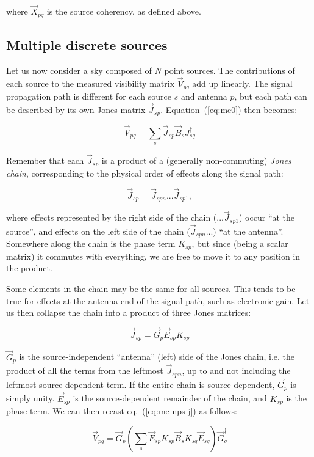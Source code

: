 \documentclass[]{aa}
\begin{document}
where $\vec X_{pq}$ is the source coherency, as defined above.
 

\subsection{Multiple discrete sources}

Let us now consider a sky composed of $N$ point sources. The contributions of each source to the measured visibility matrix $\vec V_{pq}$ add up linearly. The signal propagation path is different for each source $s$ and antenna $p$, but each path can be described by its own Jones matrix $\vec J_{sp}$. Equation~(\ref{eq:me0}) then becomes:

  \begin{equation}\label{eq:me-nps-j}
  \vec V_{pq} = \sum_{s}{\vec J_{sp} \vec B_s J^\dagger_{sq}}
  \end{equation}

Remember that each $\vec J_{sp}$ is a product of a (generally non-commuting) {\em Jones chain}, corresponding to the physical order of effects along the signal path:

  \[
  \vec J_{sp} = \vec J_{spn} ... \vec J_{sp1},
  \]

where effects represented by the right side of the chain ($...\vec J_{sp1}$) occur ``at the source'', and effects on the left side of the chain ($\vec J_{spn}...$) ``at the antenna''. Somewhere along the chain is the phase term $K_{sp}$, but since (being a scalar matrix) it commutes with everything, we are free to move it to any position in the product.

Some elements in the chain may be the same for all sources. This tends to be true for effects at the antenna end of the signal path, such as electronic gain. Let us then collapse the chain into a product of three Jones matrices:

  \[
  \vec J_{sp} = \vec G_{p} \vec E_{sp} K_{sp}
  \]

$\vec G_{p}$ is the source-independent ``antenna'' (left) side of the Jones chain, i.e. the product of all the terms from the leftmost $\vec J_{spn}$, up to and not including the leftmost source-dependent term. If the entire chain is source-dependent, $\vec G_{p}$ is simply unity. $\vec E_{sp}$ is the source-dependent remainder of the chain, and $K_{sp}$ is the phase term. We can then recast eq.~(\ref{eq:me-nps-j}) as follows:

  \begin{equation}\label{eq:me-nps-gek}
  \vec V_{pq} = \vec G_p \left ( \sum_{s}{\vec E_{sp} K_{sp} \vec B_s K^\dagger_{sq} \vec E^\dagger_{sq}} \right ) \vec G^\dagger_q
  \end{equation}
\end{document}

